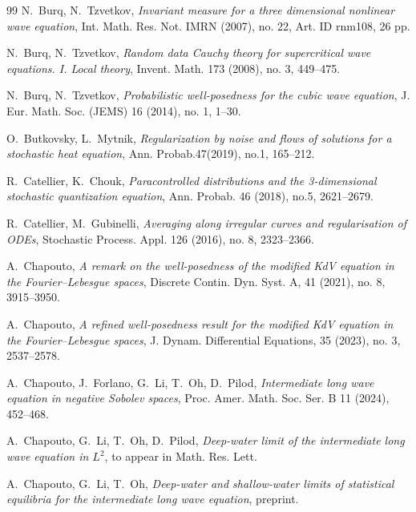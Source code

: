 \documentclass[letterpaper, 11pt,  reqno]{amsart}
\newcommand{\1}{\hspace{0.5mm}\text{I}\hspace{0.5mm}}
\numberwithin{equation}{section}
\numberwithin{theorem}{section}
\begin{document}
\begin{thebibliography}{99}
N.~Burq, N.~Tzvetkov, 
{\it Invariant measure for a three dimensional nonlinear wave equation},
 Int. Math. Res. Not. IMRN (2007), no. 22, Art. ID rnm108, 26 pp.


N.~Burq, N.~Tzvetkov, 
{\it Random data Cauchy theory for supercritical wave equations. I. Local theory},
 Invent. Math. 173 (2008), no. 3, 449--475. 


N.~Burq, N.~Tzvetkov, 
{\it Probabilistic well-posedness for the cubic wave equation},
 J. Eur. Math. Soc. (JEMS) 16 (2014), no. 1, 1--30. 
 
 

O.~Butkovsky, L.~Mytnik, 
{\it Regularization by noise and flows of solutions for a stochastic heat equation},
Ann. Probab.47(2019), no.1, 165--212.


R.~Catellier, K.~Chouk,
{\it Paracontrolled distributions and the 3-dimensional stochastic quantization equation},
Ann. Probab. 46 (2018), no.5, 2621--2679.





R.~Catellier, M.~Gubinelli, 
{\it Averaging along irregular curves and regularisation of ODEs}, 
Stochastic Process. Appl. 126 (2016), no. 8, 2323--2366. 



A.~Chapouto, 
{\it A remark on the well-posedness of the modified KdV equation in the Fourier--Lebesgue spaces}, Discrete Contin. Dyn. Syst. A, 41 (2021), no. 8, 3915--3950.

A.~Chapouto, 
{\it  A refined well-posedness result for the modified KdV equation in the Fourier--Lebesgue spaces}, 
 J. Dynam. Differential Equations, 35 (2023), no. 3, 2537--2578.



A.~Chapouto, J.~Forlano, G.~Li, T.~Oh, D.~Pilod,
{\it  Intermediate long wave equation in negative Sobolev spaces},
 Proc. Amer. Math. Soc. Ser. B 11 (2024), 452--468.



A.~Chapouto, G.~Li, T.~Oh, D.~Pilod,
{\it Deep-water limit of the intermediate long wave equation in $L^2$},
to appear in Math. Res. Lett.


A.~Chapouto, G.~Li, T.~Oh, 
{\it
Deep-water and shallow-water limits
of statistical equilibria
for the intermediate long wave equation}, 
preprint.





\end{thebibliography}
\end{document}
